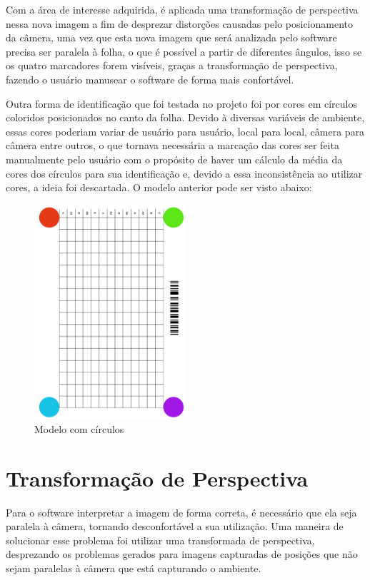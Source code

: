 \documentclass[12pt]{report}
\begin{document}
Com a área de interesse adquirida, é aplicada uma transformação de perspectiva nessa nova imagem a fim de  desprezar distorções causadas pelo posicionamento da câmera, uma vez que esta nova imagem que será analizada pelo software precisa ser paralela à folha, o que é possível a partir de diferentes ângulos, isso se os quatro marcadores forem visíveis, graças a transformação de perspectiva, fazendo o usuário manusear o software de forma mais confortável.

Outra forma de identificação que foi testada no projeto foi por cores em círculos coloridos posicionados no canto da folha. Devido à diversas variáveis de ambiente, essas cores poderiam variar de usuário para usuário, local para local, câmera para câmera entre outros, o que tornava necessária a marcação das cores ser feita manualmente pelo usuário com o propósito de haver um cálculo da média da cores dos círculos para sua identificação e, devido a essa inconsistência ao utilizar cores, a ideia foi descartada. O modelo anterior pode ser visto abaixo:

\begin{figure}[H]
  \centering
    \includegraphics[angle=90,origin=c,width=0.5\textwidth]{imagens/circulos.png}
    \caption{Modelo com círculos}
  \label{fig:circulos}
\end{figure}


\chapter{Transformação de Perspectiva}
\label{cha:cha5}

Para o software interpretar a imagem de forma correta, é necessário que ela seja paralela à câmera, tornando desconfortável a sua utilização. Uma maneira de solucionar esse problema foi utilizar uma transformada de perspectiva, desprezando os problemas gerados para imagens capturadas de posições que não sejam paralelas à câmera que está capturando o ambiente.
\end{document}
